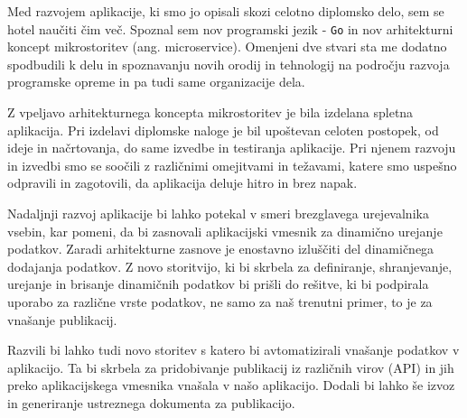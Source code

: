 Med razvojem aplikacije, ki smo jo opisali skozi celotno diplomsko delo, sem se hotel naučiti čim več. Spoznal sem nov programski jezik - \verb=Go= in nov arhitekturni koncept mikrostoritev (ang. microservice). Omenjeni dve stvari sta me dodatno spodbudili k delu in spoznavanju novih orodij in tehnologij na področju razvoja programske opreme in pa tudi same organizacije dela.

Z vpeljavo arhitekturnega koncepta mikrostoritev je bila izdelana spletna aplikacija. Pri izdelavi diplomske naloge je bil upoštevan celoten postopek, od ideje in načrtovanja, do same izvedbe in testiranja aplikacije. Pri njenem razvoju in izvedbi smo se soočili z različnimi omejitvami in težavami, katere smo uspešno odpravili in zagotovili, da aplikacija deluje hitro in brez napak.

Nadaljnji razvoj aplikacije bi lahko potekal v smeri brezglavega urejevalnika vsebin, kar pomeni, da bi zasnovali aplikacijski vmesnik za dinamično urejanje podatkov. Zaradi arhitekturne zasnove je enostavno izluščiti del dinamičnega dodajanja podatkov. Z novo storitvijo, ki bi skrbela za definiranje, shranjevanje, urejanje in brisanje dinamičnih podatkov bi prišli do rešitve, ki bi podpirala uporabo za različne vrste podatkov, ne samo za naš trenutni primer, to je za vnašanje publikacij.

Razvili bi lahko tudi novo storitev s katero bi avtomatizirali vnašanje podatkov v aplikacijo. Ta bi skrbela za pridobivanje publikacij iz različnih virov (API) in jih preko aplikacijskega vmesnika vnašala v našo aplikacijo. Dodali bi lahko še izvoz in generiranje ustreznega dokumenta za publikacijo.

\clearpage
{}






